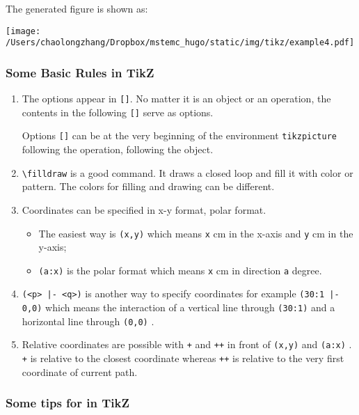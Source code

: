 \documentclass[koma,utopia,a4paper,captions=tableheading,11pt,listings-sv,microtype,paralist,colorlinks=true,urlcolor=blue]{org-article}
\begin{document}
The generated figure is shown as:
\begin{center}
\texttt{[image: /Users/chaolongzhang/Dropbox/mstemc\_hugo/static/img/tikz/example4.pdf]}
\end{center}


\subsubsection{Some Basic Rules in TikZ}
\label{sec:orgdb48b38}


\begin{enumerate}
\item The options appear in \texttt{[]}. No matter it is an object or an operation, the
contents in the following  \texttt{[]} serve as options.

Options \texttt{[]} can be at the very beginning of the environment \texttt{tikzpicture}
following the operation, following the object.

\item \texttt{\textbackslash{}filldraw} is a good command. It draws a closed loop and fill it with color or
pattern. The colors for filling and drawing can be different.

\item Coordinates can be specified in x-y format, polar format.
\begin{itemize}
\item The easiest way is \texttt{(x,y)} which means \texttt{x} cm in the x-axis and \texttt{y} cm in the
y-axis;
\item \texttt{(a:x)} is the polar format which means \texttt{x} cm in direction \texttt{a} degree.
\end{itemize}
\item \texttt{(<p> |- <q>)} is another way to specify coordinates for example \texttt{(30:1 |- 0,0)}
which means the interaction of a vertical line through \texttt{(30:1)} and a
horizontal line through \texttt{(0,0)} .
\item Relative coordinates are possible with \texttt{+} and \texttt{++} in front of \texttt{(x,y)} and \texttt{(a:x)} .
\texttt{+} is relative to the closest coordinate whereas \texttt{++} is relative to the very
first coordinate of current path.
\end{enumerate}

\subsubsection{Some tips for in TikZ}
\label{sec:org8e92c4c}
\end{document}
